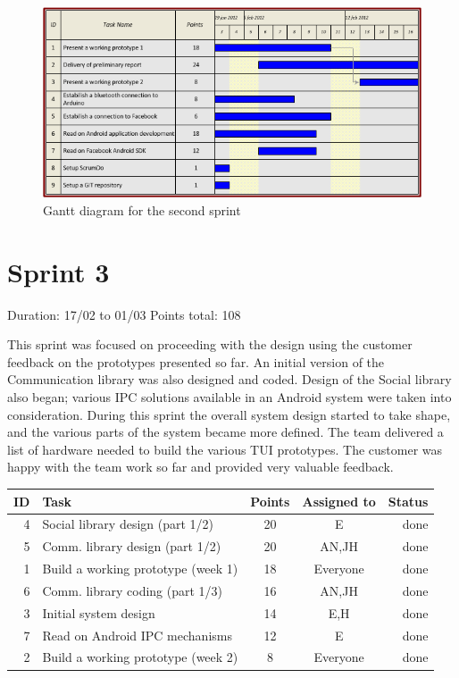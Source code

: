 \begin{figure}[h!]
\centering \includegraphics[scale=0.8]{img/sprints-gantt2.png}
\caption{Gantt diagram for the second sprint}
\label{fig:sprints-gantt2}
\end{figure}

\newpage

\section{Sprint 3}

Duration: 17/02 to 01/03\newline
Points total: 108

This sprint was focused on proceeding with the design using the customer
feedback on the prototypes presented so far. An initial version of the
Communication library was also designed and coded. Design of the Social library
also began; various IPC solutions available in an Android system were taken into
consideration. During this sprint the overall system design started to take
shape, and the various parts of the system became more defined. The team
delivered a list of hardware needed to build the various TUI prototypes.
The customer was happy with the team work so far and provided very valuable
feedback.

\begin{table}[ht!]
\begin{tabular}{ | r | l | c | c | r | }

\hline
\textbf{ID} & \textbf{Task} & \textbf{Points} & \textbf{Assigned to} & \textbf{Status} \\
\hline

 4 & Social library design (part 1/2)				& 20 & E		& done \\
\hline
 5 & Comm. library design (part 1/2)				& 20 & AN,JH	& done \\
\hline
 1 & Build a working prototype (week 1)				& 18 & Everyone & done \\
\hline
 6 & Comm. library coding (part 1/3)				& 16 & AN,JH	& done \\
\hline
 3 & Initial system design							& 14 & E,H		& done \\
\hline
 7 & Read on Android IPC mechanisms					& 12 & E		& done \\
\hline
 2 & Build a working prototype (week 2)				& 8 & Everyone	& done \\
\hline

\end{tabular}
\end{table}

